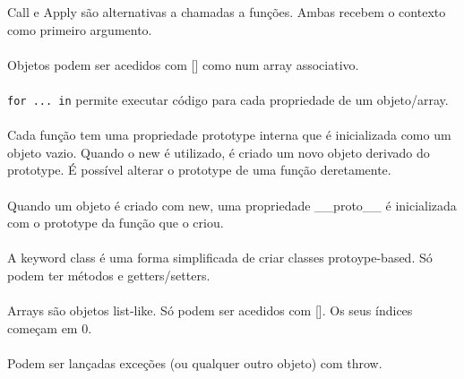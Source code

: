 \documentclass[../resumosLTW.tex]{subfiles}
\begin{document}
Call e Apply são alternativas a chamadas a funções. Ambas recebem o contexto como primeiro argumento.

\paragraph{}

Objetos podem ser acedidos com [] como num array associativo.

\paragraph{}

\lstinline{for ... in} permite executar código para cada propriedade de um objeto/array.

\paragraph{}

Cada função tem uma propriedade prototype interna que é inicializada como um objeto vazio.
Quando o new é utilizado, é criado um novo objeto derivado do prototype.
É possível alterar o prototype de uma função deretamente.

\paragraph{}

Quando um objeto é criado com new, uma propriedade \_\_proto\_\_ é inicializada com o prototype da função que o criou.

\paragraph{}

A keyword class é uma forma simplificada de criar classes protoype-based.
Só podem ter métodos e getters/setters.

\paragraph{}

Arrays são objetos list-like.
Só podem ser acedidos com [].
Os seus índices começam em 0.

\paragraph{}

Podem ser lançadas exceções (ou qualquer outro objeto) com throw.
\end{document}
